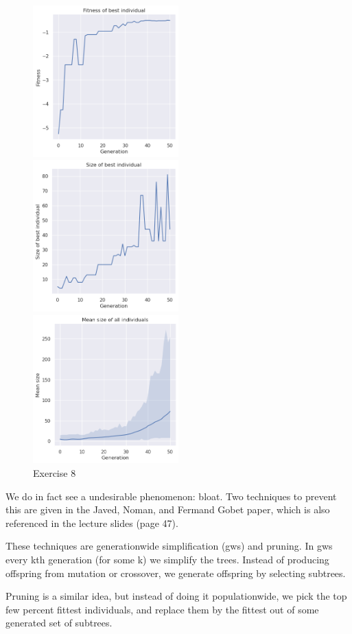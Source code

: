 \documentclass{scrartcl}
\begin{document}
\begin{figure}
  \caption{Exercise 8}
  \label{fig8}
  \includegraphics[width=0.5\textwidth]{8/score_best}

  \includegraphics[width=0.5\textwidth]{8/size_best}

  \includegraphics[width=0.5\textwidth]{8/mean_size}
\end{figure}

We do in fact see a undesirable phenomenon: bloat. Two techniques to
prevent this are given in the Javed, Noman, and Fermand Gobet paper, which
is also referenced in the lecture slides (page 47).

These techniques are generationwide simplification (gws) and pruning. In
gws every kth generation (for some k) we simplify the trees. Instead of
producing offspring from mutation or crossover, we generate offspring by
selecting subtrees.

Pruning is a similar idea, but instead of doing it populationwide, we pick
the top few percent fittest individuals, and replace them by the fittest
out of some generated set of subtrees.
\end{document}
